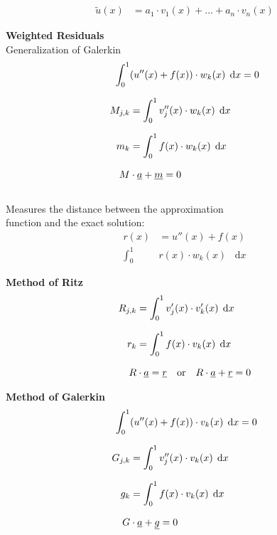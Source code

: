 \documentclass[
final,
a4paper,
oneside,
parskip=full,
headings=standardclasses,
headings=big,
pointednumbers,
fleqn
]{scrartcl}
\newcommand*\difx{\; \mathop{}\!\mathrm{d}x}
\newcommand{\kl}[1]{{\left( #1 \right)}}
\begin{document}
    
    {\setlength{\abovedisplayskip}{-6pt}
    \setlength{\belowdisplayskip}{-12pt}
    \begin{align*}
    \widetilde{u}\kl{x} & = a_1 \cdot v_1\kl{x} + \ldots + a_n \cdot v_n\kl{x}
    \end{align*}}

    {\bf{Weighted Residuals}} \\
    Generalization of Galerkin \\
    {\setlength{\abovedisplayskip}{-6pt}
    \setlength{\belowdisplayskip}{-12pt}
    \begin{align*}
    \int_{0}^{1}&{\kl{u''\kl{x} + f\kl{x}} \cdot w_k\kl{x} \difx} = 0  \\[0.25cm]
    M_{j,k} & = \int_{0}^{1}{v_j''\kl{x} \cdot w_k\kl{x} \difx}  \\[0.25cm]
    m_k & = \int_{0}^{1}{f\kl{x} \cdot w_k\kl{x} \difx}   \\[0.25cm]
    M &\cdot \uline{a} + \uline{m} = 0
    \end{align*}} \\
    Measures the distance between the approximation\\
    function and the exact solution: \\
    {\setlength{\abovedisplayskip}{-6pt}
    \setlength{\belowdisplayskip}{-12pt}
    \begin{align*}
    r\kl{x} & = u''\kl{x} + f\kl{x} \\[0.25cm]
    \int_{0}^{1}&{r\kl{x} \cdot w_k\kl{x} \difx}
    \end{align*}}
    
    {\bf{Method of Ritz}} \\
    {\setlength{\abovedisplayskip}{-6pt}
    \setlength{\belowdisplayskip}{-12pt}
    \begin{align*}
    R_{j,k} & = \int_{0}^{1}{v_j'\kl{x} \cdot v_k'\kl{x} \difx}  \\[0.25cm]
    r_k &= \int_{0}^{1}{f\kl{x} \cdot v_k\kl{x} \difx}   \\[0.25cm]
    R &\cdot \uline{a} = \uline{r} \quad \text{or} \quad R \cdot \uline{a} + \uline{r} = 0
    \end{align*}}

    {\bf{Method of Galerkin}} \\
    {\setlength{\abovedisplayskip}{-6pt}
    \setlength{\belowdisplayskip}{-12pt}
    \begin{align*}
    \int_{0}^{1}&{\kl{u''\kl{x} + f\kl{x}} \cdot v_k\kl{x} \difx} = 0  \\[0.25cm]
    G_{j,k} & = \int_{0}^{1}{v_j''\kl{x} \cdot v_k\kl{x} \difx}  \\[0.25cm]
    g_k &= \int_{0}^{1}{f\kl{x} \cdot v_k\kl{x} \difx}   \\[0.25cm]
    G &\cdot \uline{a} + \uline{g} = 0
    \end{align*}}
    
\end{document}
